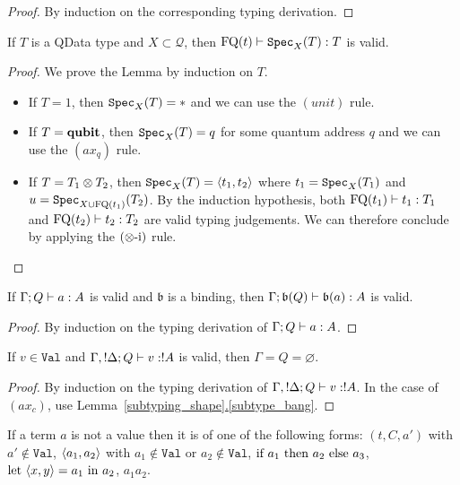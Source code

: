 \documentclass[twoside]{article}
\begin{document}
\begin{proof}
By induction on the corresponding typing derivation.
\end{proof}

\begin{lemma}
\label{specimen}
If $T$ is a QData type and $X\subset \mathcal{Q}$, then 
$\mathop{\textrm{FQ}}\nolimits(t)\vdash \texttt{Spec}_X(T):T$ is valid.
\end{lemma}

\begin{proof}
We prove the Lemma by induction on $T$.
  \begin{itemize}
    \item If $T=1$, then $\texttt{Spec}_X(T)=*$ and we can use the $(unit)$ rule.
    \item If $T=\textrm{\bf qubit}$, then $\texttt{Spec}_X(T)=q$ for some quantum address $q$ and we can 
          use the $(ax_q)$ rule.
    \item If $T=T_1\otimes T_2$, then $\texttt{Spec}_X(T)=\langle t_1,t_2\rangle$ where $t_1=\texttt{Spec}_X(T_1)$ 
          and $u=\texttt{Spec}_{X\cup \mathop{\textrm{FQ}}\nolimits(t_1)}(T_2)$. By the induction hypothesis, both 
          $\mathop{\textrm{FQ}}\nolimits(t_1)\vdash t_1:T_1$ and $\mathop{\textrm{FQ}}\nolimits(t_2)\vdash t_2:T_2$ are valid typing 
          judgements. We can therefore conclude by applying the $(\otimes\mbox{-i})$ rule.
  \end{itemize}
\end{proof}

\begin{lemma}
\label{binding_judgement}
If $\Gamma;Q \vdash a:A$ is valid and $\mathfrak{b}$ is a 
binding, then $\Gamma;\mathfrak{b} (Q) \vdash \mathfrak{b}(a):A$ is valid.
\end{lemma}

\begin{proof}
By induction on the typing derivation of $\Gamma;Q \vdash a:A$.
\end{proof}

\begin{lemma}
\label{context_value}
If $v\in\mathtt{Val}$ and $\Gamma,!\Delta;Q \vdash v:!A$ is valid, 
then $\Gamma=Q=\varnothing$.
\end{lemma}

\begin{proof}
By induction on the typing derivation of $\Gamma,!\Delta;Q \vdash v:!A$. 
In the case of $(ax_c)$, use Lemma~\hyperref[subtype_bang]{\ref*{subtyping_shape}.\ref*{subtype_bang}}.
\end{proof}

\begin{lemma}
\label{non_values}
If a term $a$ is not a value then it is of one 
of the following forms: $(t,C,a')$ with $a'\notin \mathtt{Val}$, 
$\langle a_1,a_2\rangle$ with $a_1\notin \mathtt{Val}$ or $a_2\notin \mathtt{Val}$, 
$\text{if}~ a_1 ~\text{then}~ a_2 ~\text{else}~ a_3$, $\text{let}~ \langle x,y\rangle = a_1 ~\text{in}~ a_2$, $a_1a_2$.
\end{lemma}
\end{document}
